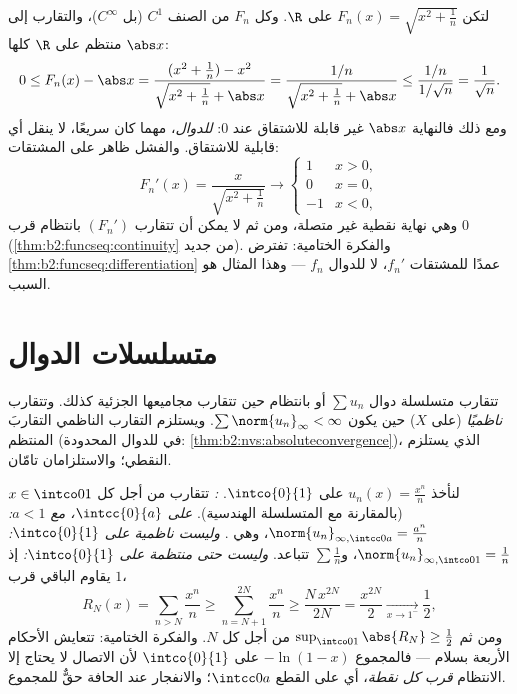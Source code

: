 \begin{example}\label{ex:b2:funcseq:sqrtabs}
لتكن $F_n(x) = \sqrt{x^2 + \frac1n}$ على $\R$. وكل $F_n$ من الصنف
$C^1$ (بل $C^\infty$)، والتقارب إلى $\abs x$
منتظم على $\R$ كلها:
\[
0 \leq F_n(x) - \abs x
= \frac{(x^2 + \frac1n) - x^2}{\sqrt{x^2+\frac1n} + \abs x}
= \frac{1/n}{\sqrt{x^2 + \frac1n} + \abs x}
\leq \frac{1/n}{1/\sqrt n} = \frac{1}{\sqrt n} .
\]
ومع ذلك فالنهاية $\abs x$ غير قابلة للاشتقاق عند $0$:  \emph{للدوال}، مهما كان سريعًا، لا ينقل أي
قابلية للاشتقاق. والفشل ظاهر على المشتقات:
\[
F_n'(x) = \frac{x}{\sqrt{x^2 + \frac1n}}
\longrightarrow \begin{cases} 1 & x > 0,\\ 0 & x = 0,\\
-1 & x < 0, \end{cases}
\]
وهي نهاية نقطية غير متصلة، ومن ثم لا يمكن أن تتقارب $(F_n')$
بانتظام قرب $0$ (\cref{thm:b2:funcseq:continuity} من جديد).
والفكرة الختامية: تفترض
\cref{thm:b2:funcseq:differentiation} عمدًا
 للمشتقات $f_n'$، لا للدوال $f_n$ ---
وهذا المثال هو السبب.
\end{example}

\section{متسلسلات الدوال}

\begin{definition}\label{def:b2:funcseq:series}
تتقارب متسلسلة دوال $\sum u_n$  أو بانتظام حين تتقارب
مجاميعها الجزئية كذلك. وتتقارب
\emph{ناظميًا} (على $X$) حين يكون $\sum
\norm{u_n}_\infty < \infty$. ويستلزم التقارب الناظمي التقاربَ
المنتظم (في  للدوال المحدودة:
\cref{thm:b2:nvs:absoluteconvergence})، الذي يستلزم النقطي؛
والاستلزامان تامّان.
\end{definition}

\begin{example}\label{ex:b2:funcseq:threemodes}
لنأخذ $u_n(x) = \frac{x^n}{n}$ على $\intco{0}{1}$. \emph{:}
تتقارب من أجل كل $x \in \intco01$ (بالمقارنة مع
المتسلسلة الهندسية). \emph{ على $\intcc{0}{a}$، مع $a < 1$:}
$\norm{u_n}_{\infty,\intcc0a} = \frac{a^n}{n}$، وهي .
\emph{وليست ناظمية على $\intco{0}{1}$:}
$\norm{u_n}_{\infty,\intco01} = \frac1n$، و$\sum\frac1n$
تتباعد. \emph{وليست حتى منتظمة على $\intco{0}{1}$:} إذ
يقاوم الباقي قرب $1$،
\[
R_N(x) = \sum_{n>N}\frac{x^n}{n}
\geq \sum_{n=N+1}^{2N}\frac{x^n}{n}
\geq \frac{N\,x^{2N}}{2N} = \frac{x^{2N}}{2}
\xrightarrow[x\to1^-]{} \frac12 ,
\]
ومن ثم $\sup_{\intco01}\abs{R_N} \geq \frac12$ من أجل كل $N$.
والفكرة الختامية: تتعايش الأحكام الأربعة بسلام --- فالمجموع
$-\ln(1-x)$  على $\intco{0}{1}$ لأن
الاتصال لا يحتاج إلا الانتظام \emph{قرب كل نقطة}، أي
على القطع $\intcc0a$؛ والانفجار عند الحافة حقٌّ
للمجموع.
\end{example}

